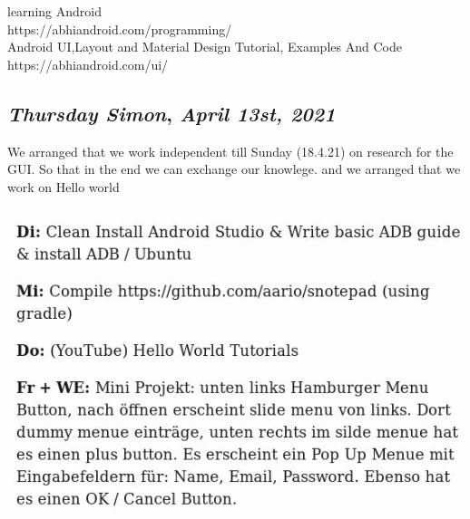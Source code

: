 learning Android \\
https://abhiandroid.com/programming/ \\

Android UI,Layout and Material Design Tutorial, Examples And Code\\
https://abhiandroid.com/ui/



\def\day{\textit{April 13st, 2021}}
\def\weekday{\textit{Thursday Simon}}
\subsection*{\weekday, \day}
We arranged that we work independent till Sunday (18.4.21) on research for the GUI. So that in the end we can exchange our knowlege. 
and we arranged that we work on Hello world 



\includegraphics[width=.8\textwidth]{media/WochenPlan13.4.jpeg}















